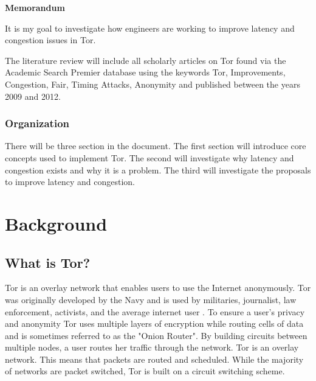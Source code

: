 \documentclass[letterpaper,12pt]{texMemo}
\begin{document}
\singlespace
\begin{center}
\large {\bf Memorandum}
\end{center}
\setlength{\topmargin}{0in}
\maketitle

It is my goal to investigate how engineers are working to improve latency and congestion issues in Tor.

The literature review will include all scholarly articles on Tor found via the Academic Search
Premier database using the keywords Tor, Improvements, Congestion, Fair, Timing Attacks,
Anonymity and published between the years 2009 and 2012.

\subsubsection*{Organization}
There will be three section in the document. The first section will introduce core concepts used to
implement Tor. The second will investigate why latency and congestion exists and why it is a
problem. The third will investigate the proposals to improve latency and congestion.

\section*{Background}

    \subsection*{What is Tor?}
    Tor is an overlay network that enables users to use the Internet anonymously. Tor was originally
    developed by the Navy and is used by militaries, journalist, law enforcement, activists, and the
    average internet user \citep[2]{Tor:web}. To ensure a user's privacy and anonymity Tor uses multiple
    layers of encryption while routing cells of data and is sometimes referred to as the "Onion
    Router". By building circuits between multiple nodes, a user routes her traffic through the
    network. Tor is an overlay network. This means that packets are routed and scheduled. While the
    majority of networks are packet switched, Tor is built on a circuit switching scheme.
\end{document}

